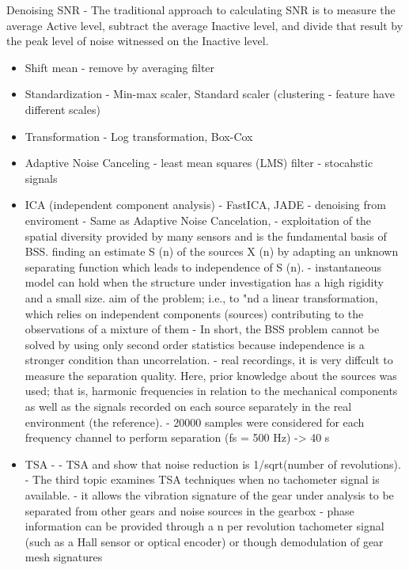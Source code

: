 Denoising
SNR - The traditional approach to calculating SNR is to measure the average Active level, subtract the average Inactive
level, and divide that result by the peak level of noise witnessed on the Inactive level. 

\begin{itemize}
\item Shift mean - remove by averaging filter
\item Standardization - Min-max scaler, Standard scaler (clustering - feature have different scales)
\item Transformation - Log transformation, Box-Cox
\item Adaptive Noise Canceling -  least mean squares (LMS) filter - stocahstic signals
\item ICA (independent component analysis) - FastICA, JADE - denoising from enviroment - Same as Adaptive Noise Cancelation, 		- exploitation of the spatial diversity provided by many sensors and is the fundamental basis of BSS. finding an estimate S (n) of the sources X (n) by adapting an unknown separating function which leads to independence of S (n). 
	- instantaneous model can hold when the structure under investigation has a high rigidity and a small size. aim of the problem; i.e., to "nd a linear transformation, which relies on independent components (sources) contributing to the observations of a mixture of them
	- In short, the BSS problem cannot be solved by using only second order statistics because independence is a stronger condition than uncorrelation.
	- real recordings, it is very diffcult to measure the separation quality. Here, prior knowledge about the sources was used; that is, harmonic frequencies in relation to the mechanical components as well as the signals recorded on each source separately in the real environment (the reference).
	- 20000 samples were considered for each frequency channel to perform separation (fs = 500 Hz) -> 40 s
\item TSA - 
	- TSA and show that noise reduction is 1/sqrt(number of revolutions). 
	- The third topic examines TSA techniques when no tachometer signal is available. 
	- it allows the vibration signature of the gear under analysis to be separated from other gears and noise sources in the gearbox
	- phase information can be provided through a n per revolution tachometer signal (such as a Hall sensor or optical encoder) or though demodulation of gear mesh signatures	
	
	\cite{bechhoefer_review_2009}
\end{itemize}

